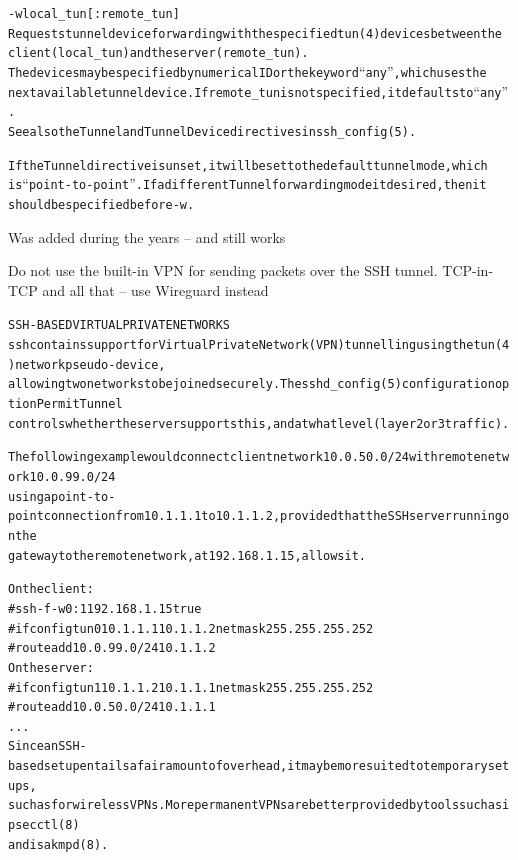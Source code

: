 \documentclass[Screen16to9,17pt]{foils}
\begin{document}

\begin{alltt}\scriptsize
-w local_tun[:remote_tun]
    Requests  tunnel  device  forwarding  with  the specified tun(4) devices between the
    client (local_tun) and the server (remote_tun).
    The devices may be specified by numerical ID or the keyword “any”,  which  uses  the
    next available tunnel device.  If remote_tun is not specified, it defaults to “any”.
    See also the Tunnel and TunnelDevice directives in ssh_config(5).

    If  the  Tunnel directive is unset, it will be set to the default tunnel mode, which
    is “point-to-point”.  If a different Tunnel forwarding  mode  it  desired,  then  it
    should be specified before -w.
\end{alltt}

\begin{list2}
\item Was added during the years -- and still works
\item Do not use the built-in VPN for sending packets over the SSH tunnel. TCP-in-TCP and all that -- use Wireguard instead
\end{list2}



\begin{alltt}\scriptsize
SSH-BASED VIRTUAL PRIVATE NETWORKS
  ssh  contains  support for Virtual Private Network (VPN) tunnelling using the tun(4) network pseudo-device,
  allowing two networks to be joined securely.  The  sshd_config(5)  configuration option PermitTunnel
  controls whether the server supports this, and at what level (layer 2 or 3 traffic).

  The  following  example  would  connect  client  network  10.0.50.0/24  with  remote network 10.0.99.0/24
  using a point-to-point connection from 10.1.1.1 to 10.1.1.2, provided that  the SSH server running on the
  gateway to the remote network, at 192.168.1.15, allows it.

  On the client:
             # ssh -f -w 0:1 192.168.1.15 true
             # ifconfig tun0 10.1.1.1 10.1.1.2 netmask 255.255.255.252
             # route add 10.0.99.0/24 10.1.1.2
  On the server:
             # ifconfig tun1 10.1.1.2 10.1.1.1 netmask 255.255.255.252
             # route add 10.0.50.0/24 10.1.1.1
  ...
  Since  an SSH-based setup entails a fair amount of overhead, it may be more suited to temporary setups,
  such as for wireless VPNs.  More permanent VPNs are better  provided  by  tools such as ipsecctl(8)
  and isakmpd(8).
\end{alltt}
\end{document}
